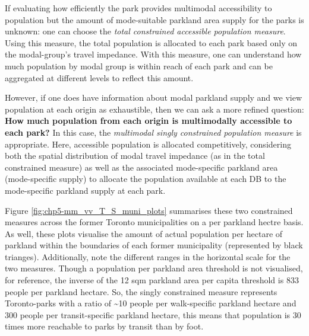 \documentclass[
11pt, %
oneside, %
english, %
singlespacing, %
]{macthesis} %
\begin{document}
If evaluating how efficiently the park provides multimodal accessibility to population but the amount of mode-suitable parkland area supply for the parks is unknown: one can choose the \emph{total constrained accessible population measure}. Using this measure, the total population is allocated to each park based only on the modal-group's travel impedance. With this measure, one can understand how much population by modal group is within reach of each park and can be aggregated at different levels to reflect this amount.

However, if one does have information about modal parkland supply and we view population at each origin as exhaustible, then we can ask a more refined question: \textbf{How much population from each origin is multimodally accessible to each park?} In this case, the \emph{multimodal singly constrained population measure} is appropriate. Here, accessible population is allocated competitively, considering both the spatial distribution of modal travel impedance (as in the total constrained measure) as well as the associated mode-specific parkland area (mode-specific supply) to allocate the population available at each DB to the mode-specific parkland supply at each park.

Figure \ref{fig:chp5-mm_vv_T_S_muni_plots} summarises these two constrained measures across the former Toronto municipalities on a per parkland hectre basis. As well, these plots visualise the amount of actual population per hectare of parkland within the boundaries of each former municipality (represented by black trianges). Additionally, note the different ranges in the horizontal scale for the two measures. Though a population per parkland area threshold is not visualised, for reference, the inverse of the 12 sqm parkland area per capita threshold is 833 people per parkland hectare. So, the singly constrained measure represents Toronto-parks with a ratio of \textasciitilde10 people per walk-specific parkland hectare and 300 people per transit-specific parkland hectare, this means that population is 30 times more reachable to parks by transit than by foot.
\end{document}
